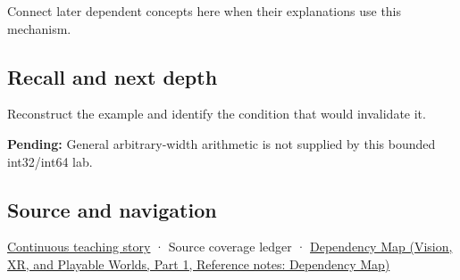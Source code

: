 \hypertarget{appendix-3333db47830f-used-by}{}

Connect later dependent concepts here when their explanations use this mechanism.

\subsection{Recall and next depth}\label{appendix-3333db47830f-recall-and-next-depth}

\hypertarget{appendix-3333db47830f-recall-and-next-depth}{}

Reconstruct the example and identify the condition that would invalidate it.

\textbf{Pending:} General arbitrary-width arithmetic is not supplied by this bounded int32/int64 lab.

\subsection{Source and navigation}\label{appendix-3333db47830f-source-and-navigation}

\hypertarget{appendix-3333db47830f-source-and-navigation}{}

\hyperref[01-foundations-i-ch001-choosing-what-information-to-keep]{Continuous teaching story} · {Source coverage ledger} · \href{../07-Vision-XR-and-Playable-Worlds-P01/main.pdf\#appendix-4ad47bdd269a}{Dependency Map (Vision, XR, and Playable Worlds, Part 1, Reference notes: Dependency Map)}
